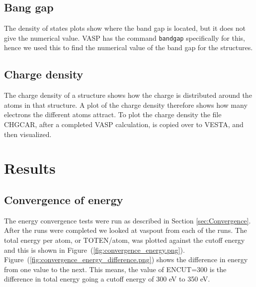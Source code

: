 \documentclass{article}
\begin{document}
  \subsection{Bang gap}

    The density of states plots show where the band gap is located, but it does not give the numerical value. VASP has the command \texttt{bandgap} specifically for this, hence we used this to find the numerical value of the band gap for the structures. \\


  \subsection{Charge density}

    The charge density of a structure shows how the charge is distributed around the atoms in that structure. A plot of the charge density therefore shows how many electrons the different atoms attract. To plot the charge density the file CHGCAR, after a completed VASP calculation, is copied over to VESTA, and then visualized.


\vspace{1cm}

\section{Results}   \label{sec:Results}

  \subsection{Convergence of energy}

     The energy convergence tests were run as described in Section \ref{sec:Convergence}. After the runs were completed we looked at vaspout from each of the runs. The total energy per atom, or TOTEN/atom, was plotted against the cutoff energy and this is shown in Figure~(\ref{fig:convergence_energy.png}). \\

     Figure~(\ref{fig:convergence_energy_difference.png}) shows the difference in energy from one value to the next. This means, the value of ENCUT=300 is the difference in total energy going a cutoff energy of 300 eV to 350 eV. \\
\end{document}
